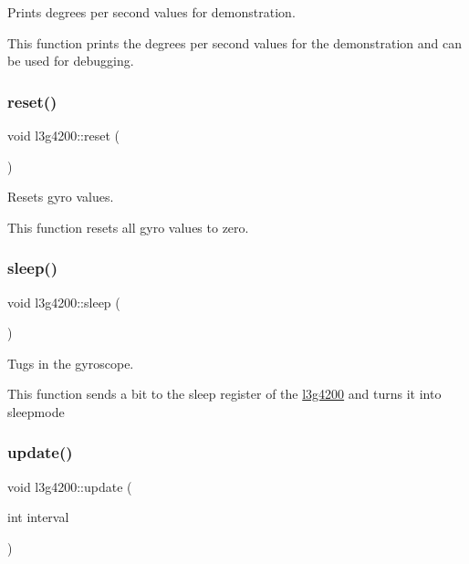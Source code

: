 Prints degrees per second values for demonstration. 

This function prints the degrees per second values for the demonstration and can be used for debugging. \mbox{\label{classl3g4200_a89f0af632b2b19efc614339e479656ed}} 
\subsubsection{\texorpdfstring{reset()}{reset()}}
{\footnotesize\ttfamily void l3g4200\+::reset (\begin{DoxyParamCaption}{ }\end{DoxyParamCaption})\hspace{0.3cm}{\ttfamily [inline]}}



Resets gyro values. 

This function resets all gyro values to zero. \mbox{\label{classl3g4200_a2503f466a114e0b31dffe17e486410fd}} 
\subsubsection{\texorpdfstring{sleep()}{sleep()}}
{\footnotesize\ttfamily void l3g4200\+::sleep (\begin{DoxyParamCaption}{ }\end{DoxyParamCaption})\hspace{0.3cm}{\ttfamily [inline]}}



Tugs in the gyroscope. 

This function sends a bit to the sleep register of the \hyperlink{classl3g4200}{l3g4200} and turns it into sleepmode \mbox{\label{classl3g4200_affd107a9d8862f7687f1eb3c4fd74ea0}} 
\subsubsection{\texorpdfstring{update()}{update()}}
{\footnotesize\ttfamily void l3g4200\+::update (\begin{DoxyParamCaption}\item[{int}]{interval }\end{DoxyParamCaption})\hspace{0.3cm}{\ttfamily [inline]}}



